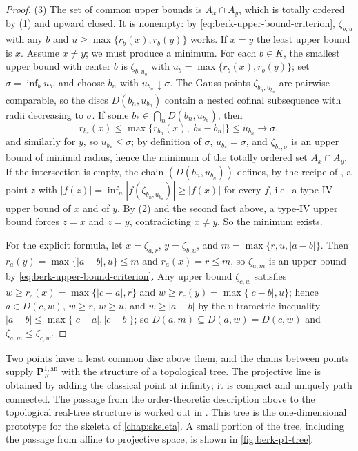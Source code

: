 \begin{proof}
(3) The set of common upper bounds is
$A_x\cap A_y$, which is totally ordered by (1) and upward closed.
It is nonempty: by
\eqref{eq:berk-upper-bound-criterion}, $\zeta_{b,u}$ with any
$b$ and $u\geq\max\{r_b(x),r_b(y)\}$ works.  If $x=y$ the least
upper bound is $x$.  Assume $x\neq y$; we must produce a minimum.
For each $b\in K$, the smallest upper bound with center $b$ is
$\zeta_{b,u_b}$ with $u_b=\max\{r_b(x),r_b(y)\}$; set
$\sigma=\inf_bu_b$, and choose $b_n$ with
$u_{b_n}\downarrow\sigma$.  The Gauss points
$\zeta_{b_n,u_{b_n}}$ are pairwise comparable, so the discs
$D(b_n,u_{b_n})$ contain a nested cofinal subsequence with radii
decreasing to $\sigma$.  If some $b_*\in\bigcap_nD(b_n,u_{b_n})$,
then
\[
 r_{b_*}(x)\leq\max\{r_{b_n}(x),|b_*-b_n|\}\leq u_{b_n}
 \longrightarrow\sigma,
\]
and similarly for $y$, so $u_{b_*}\leq\sigma$; by definition of
$\sigma$, $u_{b_*}=\sigma$, and
$\zeta_{b_*,\sigma}$ is an upper bound of minimal radius, hence the
minimum of the totally ordered set $A_x\cap A_y$.  If the
intersection is empty, the chain $(D(b_n,u_{b_n}))$ defines, by the
recipe of , a point $z$ with
$|f(z)|=\inf_n|f(\zeta_{b_n,u_{b_n}})|\geq|f(x)|$ for every $f$,
i.e.\ a type-IV upper bound of $x$ and of $y$.  By (2) and the
second fact above, a type-IV upper bound forces $z=x$ and $z=y$,
contradicting $x\neq y$.  So the minimum exists.

For the explicit formula, let $x=\zeta_{a,r}$, $y=\zeta_{b,u}$, and
$m=\max\{r,u,|a-b|\}$.  Then
$r_a(y)=\max\{|a-b|,u\}\le m$ and $r_a(x)=r\leq m$, so
$\zeta_{a,m}$ is an upper bound by
\eqref{eq:berk-upper-bound-criterion}.  Any upper bound
$\zeta_{c,w}$ satisfies $w\geq r_c(x)=\max\{|c-a|,r\}$ and
$w\geq r_c(y)=\max\{|c-b|,u\}$; hence $a\in D(c,w)$, $w\geq r$,
$w\geq u$, and $w\geq|a-b|$ by the ultrametric inequality
$|a-b|\le\max\{|c-a|,|c-b|\}$; so
$D(a,m)\subseteq D(a,w)=D(c,w)$ and
$\zeta_{a,m}\leq\zeta_{c,w}$.
\end{proof}

Two points have a least common
disc above them, and the chains between points supply
$\mathbf P^{1,\mathrm{an}}_K$ with the structure of a topological tree.
The projective line is obtained by adding the classical point at infinity;
it is compact and uniquely path connected.  The passage from the
order-theoretic description above to the topological real-tree structure is
worked out in \cite[Chapter~2]{BakerRumely2010}. This tree is the
one-dimensional prototype for the skeleta of \cref{chap:skeleta}.  A small
portion of the tree, including the passage from affine to projective space,
is shown in \cref{fig:berk-p1-tree}.

